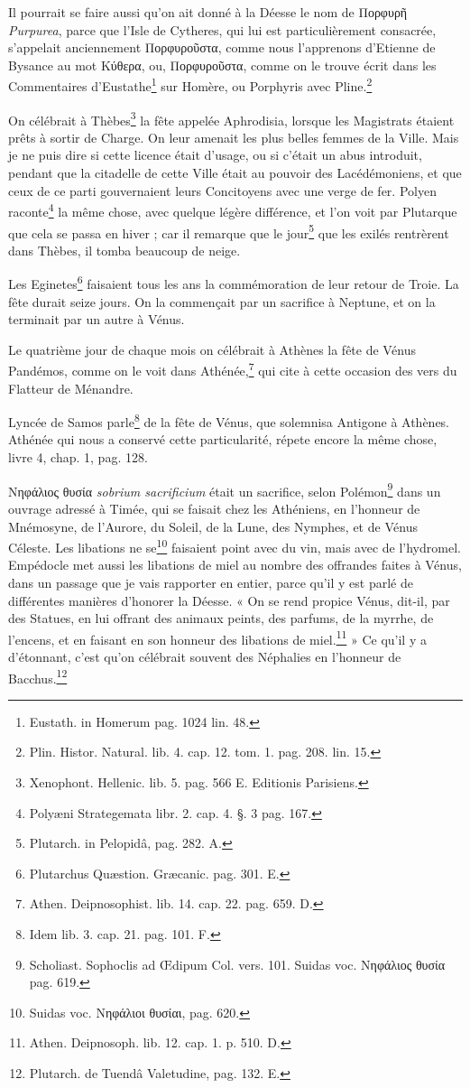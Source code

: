 \documentclass[a4paper, 11pt, oneside, polutonikogreek, french]{article}
\begin{document}
Il pourrait se faire aussi qu'on ait donné à la Déesse le nom de Πορφυρῆ \emph{Purpurea}, parce que l'Isle de Cytheres, qui lui est particulièrement consacrée, s'appelait anciennement Πορφυροῦστα, comme nous l'apprenons d'Etienne de Bysance au mot Κύθερα, ou, Πορφυροῦστα, comme on le trouve écrit dans les Commentaires d'Eustathe\footnote{Eustath. in Homerum pag. 1024 lin. 48.} sur Homère, ou Porphyris avec Pline.\footnote{Plin. Histor. Natural. lib. 4. cap. 12. tom. 1. pag. 208. lin. 15.}

On célébrait à Thèbes\footnote{Xenophont. Hellenic. lib. 5. pag. 566 E. Editionis Parisiens.} la fête appelée Aphrodisia, lorsque les Magistrats étaient prêts à sortir de Charge. On leur amenait les plus belles femmes de la Ville. Mais je ne puis dire si cette licence était d'usage, ou si c'était un abus introduit, pendant que la citadelle de cette Ville était au pouvoir des Lacédémoniens, et que ceux de ce parti gouvernaient leurs Concitoyens avec une verge de fer. Polyen raconte\footnote{Polyæni Strategemata libr. 2. cap. 4. §. 3 pag. 167.} la même chose, avec quelque légère différence, et l'on voit par Plutarque que cela se passa en hiver ; car il remarque que le jour\footnote{Plutarch. in Pelopidâ, pag. 282. A.} que les exilés rentrèrent dans Thèbes, il tomba beaucoup de neige.

Les Eginetes\footnote{Plutarchus Quæstion. Græcanic. pag. 301. E.} faisaient tous les ans la commémoration de leur retour de Troie. La fête durait seize jours. On la commençait par un sacrifice à Neptune, et on la terminait par un autre à Vénus.

Le quatrième jour de chaque mois on célébrait à Athènes la fête de Vénus Pandémos, comme on le voit dans Athénée,\footnote{Athen. Deipnosophist. lib. 14. cap. 22. pag. 659. D.} qui cite à cette occasion des vers du Flatteur de Ménandre.

Lyncée de Samos parle\footnote{Idem lib. 3. cap. 21. pag. 101. F.} de la fête de Vénus, que solemnisa Antigone à Athènes. Athénée qui nous a conservé cette particularité, répete encore la même chose, livre 4, chap. 1, pag. 128.

Νηφάλιος θυσία \emph{sobrium sacrificium} était un sacrifice, selon Polémon\footnote{Scholiast. Sophoclis ad Œdipum Col. vers. 101. Suidas voc. Νηφάλιος θυσία pag. 619.} dans un ouvrage adressé à Timée, qui se faisait chez les Athéniens, en l'honneur de Mnémosyne, de l'Aurore, du Soleil, de la Lune, des Nymphes, et de Vénus Céleste. Les libations ne se\footnote{Suidas voc. Νηφάλιοι θυσίαι, pag. 620.} faisaient point avec du vin, mais avec de l'hydromel. Empédocle met aussi les libations de miel au nombre des offrandes faites à Vénus, dans un passage que je vais rapporter en entier, parce qu'il y est parlé de différentes manières d'honorer la Déesse. « On se rend propice Vénus, dit-il, par des Statues, en lui offrant des animaux peints, des parfums, de la myrrhe, de l'encens, et en faisant en son honneur des libations de miel.\footnote{Athen. Deipnosoph. lib. 12. cap. 1. p. 510. D.} » Ce qu'il y a d'étonnant, c'est qu'on célébrait souvent des Néphalies en l'honneur de Bacchus.\footnote{Plutarch. de Tuendâ Valetudine, pag. 132. E.}
\end{document}
